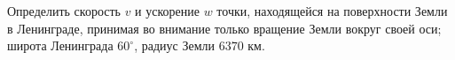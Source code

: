 Определить скорость $v$ и ускорение $w$ точки, находящейся на
поверхности Земли в Ленинграде, принимая во внимание только вращение
Земли вокруг своей оси; широта Ленинграда $60^\circ$, радиус Земли
$6370$ км.

